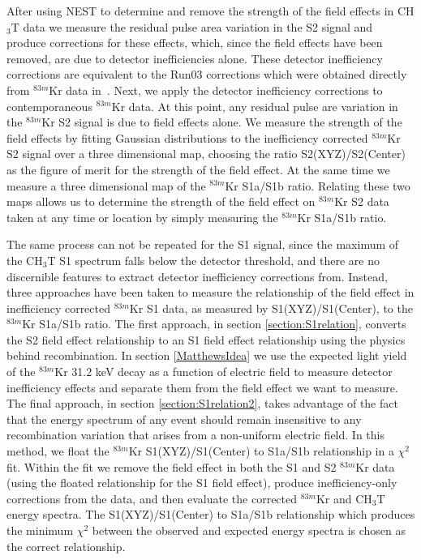 \documentclass[a4paper,10pt,twocolumn]{article}
\begin{document}
After using NEST to determine and remove the strength of the field effects in CH$_3$T data we measure the residual pulse area variation in the S2 signal and produce corrections for these effects, which, since the field effects have been removed, are due to detector inefficiencies alone.  These detector inefficiency corrections are equivalent to the Run03 corrections which were obtained directly from $^{83m}$Kr data in~\cite{Run03Reanalysis}.  Next, we apply the detector inefficiency corrections to contemporaneous $^{83m}$Kr data.  At this point, any residual pulse are variation in the $^{83m}$Kr S2 signal is due to field effects alone.  We measure the strength of the field effects by fitting Gaussian distributions to the inefficiency corrected $^{83m}$Kr S2 signal over a three dimensional map, choosing the ratio S2(XYZ)/S2(Center) as the figure of merit for the strength of the field effect.  At the same time we measure a three dimensional map of the $^{83m}$Kr S1a/S1b ratio.  Relating these two maps allows us to determine the strength of the field effect on $^{83m}$Kr S2 data taken at any time or location by simply measuring the $^{83m}$Kr S1a/S1b ratio. 


The same process can not be repeated for the S1 signal, since the maximum of the CH$_3$T S1 spectrum falls below the detector threshold, and there are no discernible features to extract detector inefficiency corrections from.  Instead, three approaches have been taken to measure the relationship of the field effect in inefficiency corrected $^{83m}$Kr S1 data, as measured by S1(XYZ)/S1(Center), to the $^{83m}$Kr S1a/S1b ratio.  The first approach, in section \ref{section:S1relation}, converts the S2 field effect relationship to an S1 field effect relationship using the physics behind recombination.  In section \ref{MatthewsIdea} we use the expected light yield of the $^{83m}$Kr 31.2 keV decay as a function of electric field to measure detector inefficiency effects and separate them from the field effect we want to measure.  The final approach, in section \ref{section:S1relation2}, takes advantage of the fact that the energy spectrum of any event should remain insensitive to any recombination variation that arises from a non-uniform electric field.  In this method, we float the $^{83m}$Kr S1(XYZ)/S1(Center) to S1a/S1b relationship in a $\chi^2$ fit.  Within the fit we remove the field effect in both the S1 and S2 $^{83m}$Kr data (using the floated relationship for the S1 field effect), produce inefficiency-only corrections from the data, and then evaluate the corrected $^{83m}$Kr and CH$_3$T energy spectra.  The  S1(XYZ)/S1(Center) to S1a/S1b relationship which produces the minimum $\chi^2$ between the observed and expected energy spectra is chosen as the correct relationship.
\end{document}
